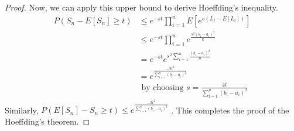 \begin{proof}
Now, we can apply this upper bound to derive Hoeffding's inequality.
$$
\begin{aligned}
P\left(S_{n}-E\left[S_{n}\right] \geq t\right) & \leq e^{-s t} \prod_{i=1}^{n} E\left[e^{s\left(L_{i}-E\left[L_{i}\right]\right)}\right] \\
& \leq e^{-s t} \prod_{i=1}^{n} e^{\frac{s^{2}\left(b_{i}-a_{i}\right)^{2}}{8}} \\
&=e^{-s t} e^{s^{2} \sum_{i=1}^{n} \frac{\left(b_{i}-a_{i}\right)^{2}}{8}} \\
&=e^{\frac{-2 t^{2}}{\sum_{i=1}^{n}\left(b_{i}-a_{i}\right)^{2}}} \\
& \text { by choosing } s=\frac{4 t}{\sum_{i=1}^{n}\left(b_{i}-a_{i}\right)^{2}}
\end{aligned}
$$
Similarly, $P\left(E\left[S_{n}\right]-S_{n} \geq t\right) \leq e^{\frac{-2 t^{2}}{\sum_{i=1}^{n}\left(b_{i}-a_{i}\right)^{2}}}$ . This completes the proof of the Hoeffding's theorem. 
\end{proof}